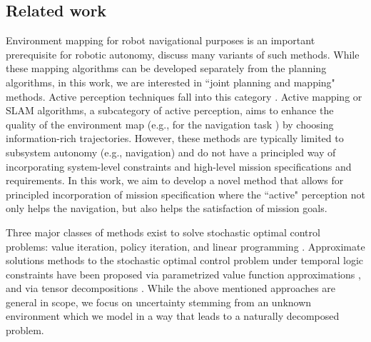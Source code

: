 \documentclass[conference]{IEEEtran}
\renewcommand{\cite}[1]{\citep{#1}}
\begin{document}
\subsection{Related work}
Environment mapping for robot navigational purposes is an important prerequisite for robotic autonomy, \cite{Thrun2005,stachniss2009_book,thrun2002robotic} discuss many variants of such methods. While these mapping algorithms can be developed separately from the planning algorithms, in this work, we are interested in ``joint planning and mapping" methods. Active perception techniques fall into this category \cite{blake1992active, aloimonos1988active,soatto2013actionable}. Active mapping or SLAM algorithms, a subcategory of active perception, aims to enhance the quality of the environment map (e.g., for the navigation task \cite{Agha2017ISRR,feder1999adaptive,davison2002simultaneous,Mu16-CDC}) by choosing information-rich trajectories. However, these methods are typically limited to subsystem autonomy (e.g., navigation) and do not have a principled way of incorporating system-level constraints and high-level mission specifications and requirements. In this work, we aim to develop a novel method that allows for principled incorporation of mission specification where the ``active" perception not only helps the navigation, but also helps the satisfaction of mission goals. 

Three major classes of methods exist to solve stochastic optimal control problems: value iteration, policy iteration, and linear programming \cite{Bertsekas1978}. Approximate solutions methods to the stochastic optimal control problem under temporal logic constraints have been proposed via parametrized value function approximations \cite{Papusha2016,Leong2016}, and via tensor decompositions \cite{Alora2016}. While the above mentioned approaches are general in scope, we focus on uncertainty stemming from an unknown environment which we model in a way that leads to a naturally decomposed problem. 

\end{document}
